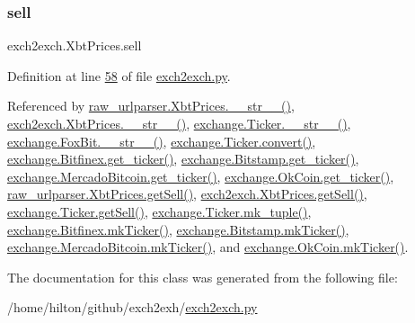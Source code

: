 \mbox{\label{classexch2exch_1_1_xbt_prices_a06fd0cfb03d485af3364a0d86fbe5385}} 
\subsubsection{\texorpdfstring{sell}{sell}}
{\footnotesize\ttfamily exch2exch.\+Xbt\+Prices.\+sell}



Definition at line \hyperlink{exch2exch_8py_source_l00058}{58} of file \hyperlink{exch2exch_8py_source}{exch2exch.\+py}.



Referenced by \hyperlink{raw__urlparser_8py_source_l00074}{raw\+\_\+urlparser.\+Xbt\+Prices.\+\_\+\+\_\+str\+\_\+\+\_\+()}, \hyperlink{exch2exch_8py_source_l00091}{exch2exch.\+Xbt\+Prices.\+\_\+\+\_\+str\+\_\+\+\_\+()}, \hyperlink{exchange_8py_source_l00136}{exchange.\+Ticker.\+\_\+\+\_\+str\+\_\+\+\_\+()}, \hyperlink{exchange_8py_source_l00610}{exchange.\+Fox\+Bit.\+\_\+\+\_\+str\+\_\+\+\_\+()}, \hyperlink{exchange_8py_source_l00069}{exchange.\+Ticker.\+convert()}, \hyperlink{exchange_8py_source_l00439}{exchange.\+Bitfinex.\+get\+\_\+ticker()}, \hyperlink{exchange_8py_source_l00511}{exchange.\+Bitstamp.\+get\+\_\+ticker()}, \hyperlink{exchange_8py_source_l00651}{exchange.\+Mercado\+Bitcoin.\+get\+\_\+ticker()}, \hyperlink{exchange_8py_source_l00716}{exchange.\+Ok\+Coin.\+get\+\_\+ticker()}, \hyperlink{raw__urlparser_8py_source_l00065}{raw\+\_\+urlparser.\+Xbt\+Prices.\+get\+Sell()}, \hyperlink{exch2exch_8py_source_l00073}{exch2exch.\+Xbt\+Prices.\+get\+Sell()}, \hyperlink{exchange_8py_source_l00103}{exchange.\+Ticker.\+get\+Sell()}, \hyperlink{exchange_8py_source_l00121}{exchange.\+Ticker.\+mk\+\_\+tuple()}, \hyperlink{exchange_8py_source_l00453}{exchange.\+Bitfinex.\+mk\+Ticker()}, \hyperlink{exchange_8py_source_l00525}{exchange.\+Bitstamp.\+mk\+Ticker()}, \hyperlink{exchange_8py_source_l00665}{exchange.\+Mercado\+Bitcoin.\+mk\+Ticker()}, and \hyperlink{exchange_8py_source_l00730}{exchange.\+Ok\+Coin.\+mk\+Ticker()}.



The documentation for this class was generated from the following file\+:\begin{DoxyCompactItemize}
\item 
/home/hilton/github/exch2exh/\hyperlink{exch2exch_8py}{exch2exch.\+py}\end{DoxyCompactItemize}
